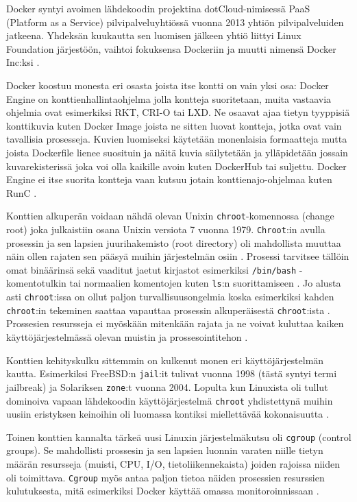 \documentclass[finnish,gradu]{tktltiki3}
\begin{document}
    Docker syntyi avoimen lähdekoodin projektina dotCloud-nimisessä PaaS (Platform as a Service) pilvipalveluyhtiössä vuonna 2013 yhtiön pilvipalveluiden jatkeena. Yhdeksän kuukautta sen luomisen jälkeen yhtiö liittyi Linux Foundation järjestöön, vaihtoi fokuksensa Dockeriin ja muutti nimensä Docker Inc:ksi \cite{docker}.
    
    Docker koostuu monesta eri osasta joista itse kontti on vain yksi osa: Docker Engine on konttienhallintaohjelma jolla kontteja suoritetaan, muita vastaavia ohjelmia ovat esimerkiksi RKT, CRI-O tai LXD. Ne osaavat ajaa tietyn tyyppisiä konttikuvia kuten Docker Image joista ne sitten luovat kontteja, jotka ovat vain tavallisia prosesseja. Kuvien luomiseksi käytetään monenlaisia formaatteja mutta joista Dockerfile lienee suosituin ja näitä kuvia säilytetään ja ylläpidetään jossain kuvarekisterissä joka voi olla kaikille avoin kuten DockerHub tai suljettu. Docker Engine ei itse suorita kontteja vaan kutsuu jotain konttienajo-ohjelmaa kuten RunC \cite{practical-container}.
    
    Konttien alkuperän voidaan nähdä olevan Unixin \texttt{chroot}-komennossa (change root) joka julkaistiin osana Unixin versiota 7 vuonna 1979. \texttt{Chroot}:in avulla prosessin ja sen lapsien juurihakemisto (root directory) oli mahdollista muuttaa näin ollen rajaten sen pääsyä muihin järjestelmän osiin \cite{containers-in-multi-user-environments}. Prosessi tarvitsee tällöin omat binäärinsä sekä vaaditut jaetut kirjastot esimerkiksi \texttt{/bin/bash} -komentotulkin tai normaalien komentojen kuten \texttt{ls}:n suorittamiseen \cite{oracle-docs-chroot}. Jo alusta asti \texttt{chroot}:issa on ollut paljon turvallisuusongelmia koska esimerkiksi kahden \texttt{chroot}:in tekeminen saattaa vapauttaa prosessin alkuperäisestä \texttt{chroot}:ista \cite{chroot-paper}. Prossesien resursseja ei myöskään mitenkään rajata ja ne voivat kuluttaa kaiken käyttöjärjestelmässä olevan muistin ja prossesointitehon \cite{chroot-blog}.
    
    Konttien kehityskulku sittemmin on kulkenut monen eri käyttöjärjestelmän kautta. Esimerkiksi FreeBSD:n \texttt{jail}:it tulivat vuonna 1998 (tästä syntyi termi jailbreak) ja Solariksen \texttt{zone}:t vuonna 2004. Lopulta kun Linuxista oli tullut dominoiva vapaan lähdekoodin käyttöjärjestelmä \texttt{chroot} yhdistettynä muihin uusiin eristyksen keinoihin oli luomassa kontiksi miellettävää kokonaisuutta \cite{lxc-docker-kubernetes}.
    
    Toinen konttien kannalta tärkeä uusi Linuxin järjestelmäkutsu oli \texttt{cgroup} (control groups). Se mahdollisti prossesin ja sen lapsien luonnin varaten niille tietyn määrän resursseja (muisti, CPU, I/O, tietoliikennekaista) joiden rajoissa niiden oli toimittava. \texttt{Cgroup} myös antaa paljon tietoa näiden prosessien resurssien kulutuksesta, mitä esimerkiksi Docker käyttää omassa monitoroinnissaan \cite{docker}.
    
\end{document}
